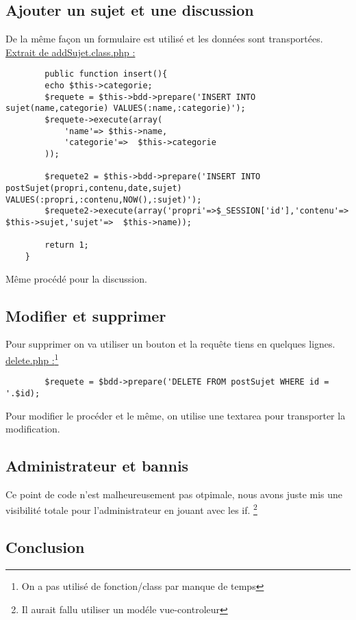 \documentclass{article}
\begin{document}
    \subsection{Ajouter un sujet et une discussion}
    \newpage
    De la même façon un formulaire est utilisé et les données sont transportées. 
    \underline{Extrait de addSujet.class.php :}
    \begin{lstlisting}
        public function insert(){
        echo $this->categorie;
        $requete = $this->bdd->prepare('INSERT INTO sujet(name,categorie) VALUES(:name,:categorie)');
        $requete->execute(array(
            'name'=> $this->name,
            'categorie'=>  $this->categorie
        ));
        
        $requete2 = $this->bdd->prepare('INSERT INTO postSujet(propri,contenu,date,sujet) VALUES(:propri,:contenu,NOW(),:sujet)');
        $requete2->execute(array('propri'=>$_SESSION['id'],'contenu'=>  $this->sujet,'sujet'=>  $this->name));
        
        return 1;
    }
    \end{lstlisting}
    Même procédé pour la discussion.
    \subsection{Modifier et supprimer}
    Pour supprimer on va utiliser un bouton et la requête tiens en quelques lignes. 
    \\
    \underline{delete.php :}\footnote{On a pas utilisé de fonction/class par manque de temps}
    \begin{lstlisting}
        $requete = $bdd->prepare('DELETE FROM postSujet WHERE id = '.$id);
    \end{lstlisting}
    Pour modifier le procéder et le même, on utilise une textarea pour transporter la modification. 
    \subsection{Administrateur et bannis}
    Ce point de code n'est malheureusement pas otpimale, nous avons juste mis une visibilité totale pour l'administrateur
    en jouant avec les if. \footnote{Il aurait fallu utiliser un modéle vue-controleur}
    \newpage
    \subsection*{Conclusion}
\end{document}
